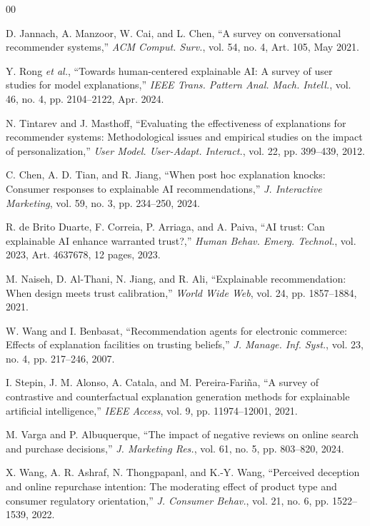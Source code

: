 \documentclass[conference]{IEEEtran}
\begin{document}
\begin{thebibliography}{00}
\setlength{\itemsep}{0pt}\setlength{\parskip}{0pt}

D. Jannach, A. Manzoor, W. Cai, and L. Chen, ``A survey on conversational
recommender systems,'' \textit{ACM Comput. Surv.}, vol. 54, no. 4, Art. 105,
May 2021.

Y. Rong \textit{et al.}, ``Towards human-centered explainable AI: A survey of user
studies for model explanations,'' \textit{IEEE Trans. Pattern Anal. Mach. Intell.},
vol. 46, no. 4, pp. 2104--2122, Apr. 2024.

N. Tintarev and J. Masthoff, ``Evaluating the effectiveness of explanations for
recommender systems: Methodological issues and empirical studies on the impact of
personalization,'' \textit{User Model. User-Adapt. Interact.}, vol. 22, pp. 399--439, 2012.

C. Chen, A. D. Tian, and R. Jiang, ``When post hoc explanation knocks: Consumer
responses to explainable AI recommendations,'' \textit{J. Interactive Marketing},
vol. 59, no. 3, pp. 234--250, 2024.

R. de Brito Duarte, F. Correia, P. Arriaga, and A. Paiva, ``AI trust: Can
explainable AI enhance warranted trust?,'' \textit{Human Behav. Emerg. Technol.},
vol. 2023, Art. 4637678, 12 pages, 2023.

M. Naiseh, D. Al-Thani, N. Jiang, and R. Ali, ``Explainable recommendation: When
design meets trust calibration,'' \textit{World Wide Web}, vol. 24, pp. 1857--1884,
2021.

W. Wang and I. Benbasat, ``Recommendation agents for electronic commerce: Effects of
explanation facilities on trusting beliefs,'' \textit{J. Manage. Inf. Syst.},
vol. 23, no. 4, pp. 217--246, 2007.

I. Stepin, J. M. Alonso, A. Catala, and M. Pereira-Fari\~{n}a, ``A survey of
contrastive and counterfactual explanation generation methods for explainable
artificial intelligence,'' \textit{IEEE Access}, vol. 9, pp. 11974--12001, 2021.

M. Varga and P. Albuquerque, ``The impact of negative reviews on online search and
purchase decisions,'' \textit{J. Marketing Res.}, vol. 61, no. 5, pp. 803--820,
2024.

X. Wang, A. R. Ashraf, N. Thongpapanl, and K.-Y. Wang, ``Perceived deception and
online repurchase intention: The moderating effect of product type and consumer
regulatory orientation,'' \textit{J. Consumer Behav.}, vol. 21, no. 6,
pp. 1522--1539, 2022.


\end{thebibliography}
\end{document}
